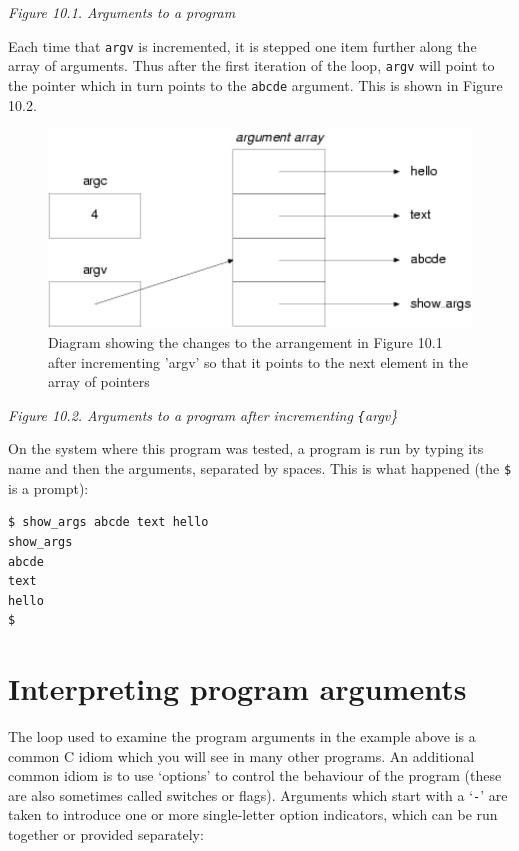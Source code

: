 \begin{center}\textit{Figure 10.1. Arguments to a program}\end{center}


  
  Each time that \texttt{argv} is incremented, it is stepped one item
   further along the array of arguments. Thus after the first iteration of
   the loop, \texttt{argv} will point to the pointer which in turn
   points to the \texttt{abcde} argument.  This is shown in
   Figure 10.2.


  \begin{figure}\centering\includegraphics[type=pdf,read=.pdf,ext=.pdf,scale=1.0]{figure/10.2}\caption{Diagram showing the changes to the arrangement in Figure 10.1                after incrementing 'argv' so that it points to the next                element in the array of pointers}\end{figure}

\begin{center}\textit{Figure 10.2. Arguments to a program after incrementing
    \texttt\{argv\}}\end{center}


  On the system where this program was tested, a program is run by typing
   its name and then the arguments, separated by spaces. This is what
   happened (the \texttt{\$} is a prompt):


  \begin{Verbatim}
$ show_args abcde text hello
show_args
abcde
text
hello
$
\end{Verbatim}

 
        \section{Interpreting program arguments}
        

  

  The loop used to examine the program arguments in the example above is
   a common C idiom which you will see in many other programs. An additional
   common idiom is to use `options' to control the behaviour of the
   program (these are also sometimes called switches or flags). Arguments which
   start with a `\texttt{-}' are taken to introduce one or more
   single-letter option indicators, which can be run together or provided
   separately:


